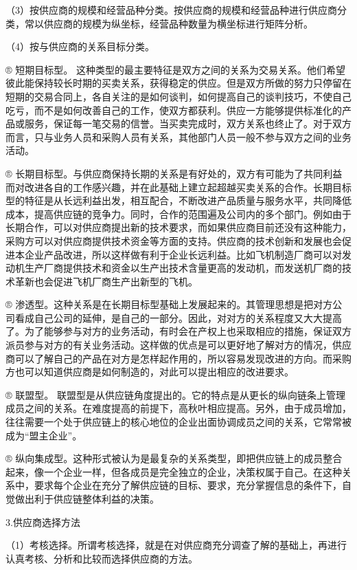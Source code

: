     （3）按供应商的规模和经营品种分类。按供应商的规模和经营品种进行供应商分类，常以供应商的规模为纵坐标，经营品种数量为横坐标进行矩阵分析。

    （4）按与供应商的关系目标分类。

    ® 短期目标型。 这种类型的最主要特征是双方之间的关系为交易关系。他们希望彼此能保持较长时期的买卖关系，获得稳定的供应。但是双方所做的努力只停留在短期的交易合同上，各自关注的是如何谈判，如何提高自己的谈判技巧，不使自己吃亏，而不是如何改善自己的工作，使双方都获利。供应一方能够提供标准化的产品或服务，保证每一笔交易的信誉。当买卖完成时，双方关系也终止了。对于双方而言，只与业务人员和采购人员有关系，其他部门人员一般不参与双方之间的业务活动。

    ® 长期目标型。与供应商保持长期的关系是有好处的，双方有可能为了共同利益而对改进各自的工作感兴趣，并在此基础上建立起超越买卖关系的合作。长期目标型的特征是从长远利益出发，相互配合，不断改进产品质量与服务水平，共同降低成本，提高供应链的竞争力。同时，合作的范围遍及公司内的多个部门。例如由于长期合作，可以对供应商提出新的技术要求，而如果供应商目前还没有这种能力，采购方可以对供应商提供技术资金等方面的支持。供应商的技术创新和发展也会促进本企业产品改进，所以这样做有利于企业长远利益。比如飞机制造厂商可以对发动机生产厂商提供技术和资金以生产出技术含量更高的发动机，而发送机厂商的技术革新也会促进飞机厂商生产出新型的飞机。

    ® 渗透型。这种关系是在长期目标型基础上发展起来的。其管理思想是把对方公司看成自己公司的延伸，是自己的一部分。因此，对对方的关系程度又大大提高了。为了能够参与对方的业务活动，有时会在产权上也采取相应的措施，保证双方派员参与对方的有关业务活动。这样做的优点是可以更好地了解对方的情况，供应商可以了解自己的产品在对方是怎样起作用的，所以容易发现改进的方向。而采购方也可以知道供应商是如何制造的，对此可以提出相应的改进要求。

    ® 联盟型。 联盟型是从供应链角度提出的。它的特点是从更长的纵向链条上管理成员之间的关系。在难度提高的前提下，高秋叶相应提高。另外，由于成员增加，往往需要一个处于供应链上的核心地位的企业出面协调成员之间的关系，它常常被成为“盟主企业”。

    ® 纵向集成型。这种形式被认为是最复杂的关系类型，即把供应链上的成员整合起来，像一个企业一样，但各成员是完全独立的企业，决策权属于自己。在这种关系中，要求每个企业在充分了解供应链的目标、要求，充分掌握信息的条件下，自觉做出利于供应链整体利益的决策。

    3.供应商选择方法

    （1）考核选择。所谓考核选择，就是在对供应商充分调查了解的基础上，再进行认真考核、分析和比较而选择供应商的方法。

